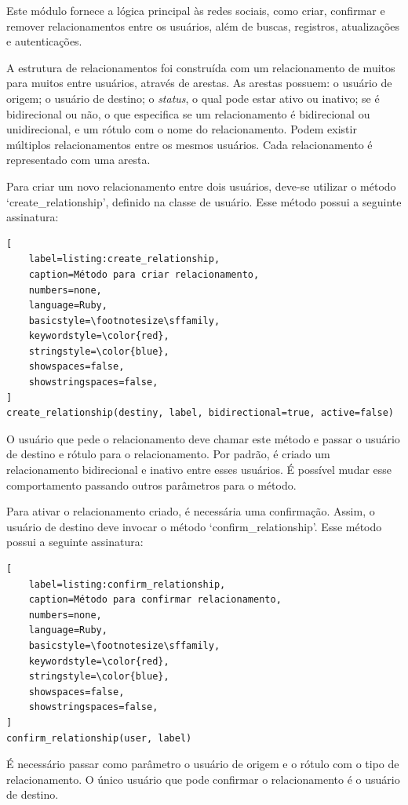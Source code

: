 Este módulo fornece a lógica principal às redes sociais, como criar, confirmar e remover relacionamentos entre os usuários, além de buscas, registros, atualizações e autenticações.

A estrutura de relacionamentos foi construída com um relacionamento de muitos para muitos entre usuários, através de arestas. As arestas possuem: o usuário de origem; o usuário de destino; o \textit{status}, o qual pode estar ativo ou inativo; se é bidirecional ou não, o que  especifica se um relacionamento é bidirecional ou unidirecional, e um rótulo com o nome do relacionamento. Podem existir múltiplos relacionamentos entre os mesmos usuários. Cada relacionamento é representado com uma aresta.

Para criar um novo relacionamento entre dois usuários, deve-se utilizar o método `create\_relationship', definido na classe de usuário. Esse método possui a seguinte assinatura:

\begin{lstlisting}[
    label=listing:create_relationship,
    caption=Método para criar relacionamento,
    numbers=none,
    language=Ruby,
    basicstyle=\footnotesize\sffamily,
    keywordstyle=\color{red},
    stringstyle=\color{blue},
    showspaces=false,
    showstringspaces=false,
]
create_relationship(destiny, label, bidirectional=true, active=false)
\end{lstlisting}

O usuário que pede o relacionamento deve chamar este método e passar o usuário de destino e rótulo para o relacionamento. Por padrão, é criado um relacionamento bidirecional e inativo entre esses usuários. É possível mudar esse comportamento passando outros parâmetros para o método.

Para ativar o relacionamento criado, é necessária uma confirmação. Assim, o usuário de destino deve invocar o método `confirm\_relationship'. Esse método possui a seguinte assinatura:

\begin{lstlisting}[
    label=listing:confirm_relationship,
    caption=Método para confirmar relacionamento,
    numbers=none,
    language=Ruby,
    basicstyle=\footnotesize\sffamily,
    keywordstyle=\color{red},
    stringstyle=\color{blue},
    showspaces=false,
    showstringspaces=false,
]
confirm_relationship(user, label)
\end{lstlisting}

É necessário passar como parâmetro o usuário de origem e o rótulo com o tipo de relacionamento. O único usuário que pode confirmar o relacionamento é o usuário de destino.

